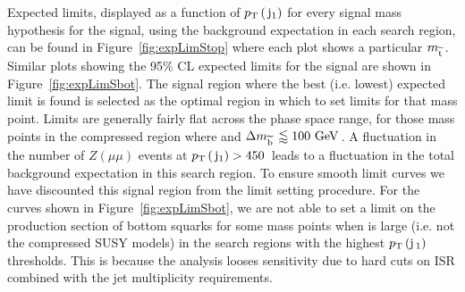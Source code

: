 Expected limits, displayed as a function of $p_{\text{T}}\,(\,\mathrm{j}_1)$ for every signal mass hypothesis for the \ttwocc signal, using the background expectation in each search region,
can be found in Figure~\ref{fig:expLimStop} where each plot shows a particular $m_{\widetilde{{\rm t}}\,}$. 
Similar plots showing the 95\% CL expected limits for the \ttwobb signal are shown in 
Figure~\ref{fig:expLimSbot}.
The signal region where the best (i.e. lowest) expected limit is found is selected as the optimal region in which to set limits for that mass point.
Limits are generally fairly flat across the phase space range, for those mass points in the compressed region where \dmstop and $\Delta m_{\widetilde{{\rm b}}\,} \lessapprox 100~\mathrm{GeV}\,$.
A fluctuation in the number of $Z(\mu\mu)$ events at $p_{\text{T}}\,(\,\mathrm{j}_1)>450$~\GeV leads to a fluctuation in the total background expectation in this search region. 
To ensure smooth limit curves we have discounted this signal region from the limit setting procedure.
For the curves shown in Figure~\ref{fig:expLimSbot}, we are not able to set a limit on the production section of bottom squarks for some mass points when \dmsbot is large (i.e. not the compressed SUSY models) in the search regions with the highest $p_{\text{T}}\,({\rm j}\,_1)$ thresholds. 
This is because the analysis looses sensitivity due to hard cuts on ISR combined with the jet multiplicity requirements.


